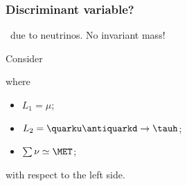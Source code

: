 \begin{frame}
\frametitle{Discriminant variable?}

\begin{minipage}[t]{.45\textwidth}
\manip \MET\ due to neutrinos.
\submanip No invariant mass!

\vspace{\baselineskip}

\begin{center}

\end{center}

\end{minipage}
\hfill\pause
\begin{minipage}[t]{.45\textwidth}
\manip Consider

\vspace{-\baselineskip}

\begin{center}

\end{center}

\vspace{-2\baselineskip}

where
\begin{itemize}
\item $L_1 = \mu$;
\item $L_2=\quarku\antiquarkd\to\tauh$;
\item $\sum\nu\simeq\MET$;
\end{itemize}
with respect to the left side.
\end{minipage}

\end{frame}

